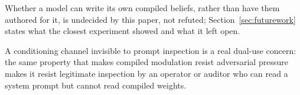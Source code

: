 Whether a model can write its own compiled beliefs, rather than have them authored for
it, is undecided by this paper, not refuted\iflongversion{}; Section~\ref{sec:futurework} states what
the closest experiment showed and what it left open\fi{}.

A conditioning channel invisible to prompt inspection is a real dual-use concern: the
same property that makes compiled modulation resist adversarial pressure makes it resist
legitimate inspection by an operator or auditor who can read a system prompt but cannot
read compiled weights.
